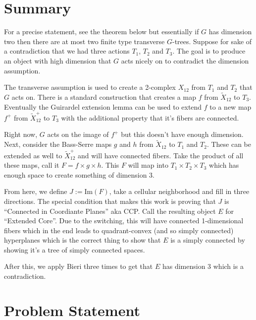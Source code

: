 \documentclass{article}
\theoremstyle{mystyle}
\theoremstyle{remark}
\begin{document}
\tableofcontents


\section{Summary}

For a precise statement, see the theorem below but essentially if $G$ has dimension two then there are at most two finite type transverse $G$-trees. Suppose for sake of a contradiction that we had three actions $T_1$, $T_2$ and $T_3$. The goal is to produce an object with high dimension that $G$ acts nicely on to contradict the dimension assumption. 

The transverse assumption is used to create a 2-complex $X_{12}$ from $T_1$ and $T_2$ that $G$ acts on. There is a standard construction that creates a map $f$ from $\widetilde X_{12}$ to $T_3$. Eventually the Guirardel extension lemma can be used to extend $f$ to a new map $ f^+$ from $\widetilde X_{12}^+$ to $T_3$ with the additional property that it's fibers are connected.

Right now, $G$ acts on the image of $f^+$ but this doesn't have enough dimension. Next, consider the Bass-Serre maps $g$ and $h$ from $\widetilde X_{12}$ to $T_1$ and $T_2$. These can be extended as well to $\widetilde X_{12}^+$ and will have connected fibers. Take the product of all these maps, call it $F = f\times g\times h$. This $F$ will map into $T_1 \times T_2 \times T_3$ which has enough space to create something of dimension 3.

From here, we define $J:=\text{Im}(F)$, take a cellular neighborhood and fill in three directions. The special condition that makes this work is proving that $J$ is ``Connected in Coordiante Planes'' aka CCP. Call the resulting object $E$ for ``Extended Core''. Due to the switching, this will have connected 1-dimensional fibers which in the end leads to quadrant-convex (and so simply connected) hyperplanes which is the correct thing to show that $E$ is a simply connected by showing it's a tree of simply connected spaces.

After this, we apply Bieri three times to get that $E$ has dimension 3 which is a contradiction.


\section{Problem Statement}
\end{document}
